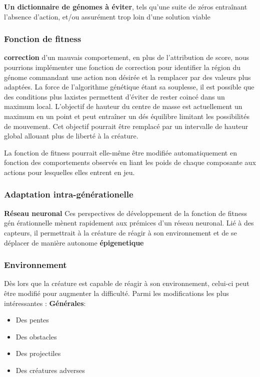 \documentclass[journal, a4paper]{IEEEtran}
\begin{document}
	\textbf{Un dictionnaire de génomes à éviter}, tels qu'une suite
	de zéros
	entraînant l'absence d'action, et/ou assurément trop loin d'une
	solution viable
\subsubsection{Fonction de fitness}
	\textbf{correction} d'un mauvais comportement, en plus de
	l'attribution	de score, nous
	pourrions implémenter une fonction de correction pour identifier
	la région du génome commandant une action non désirée et la
	remplacer par des valeurs plus adaptées.
	La force de l'algorithme génétique étant sa souplesse, il est possible
	que des conditions plus laxistes permettent d'éviter de rester coincé
	dans un maximum local.
	L'objectif de hauteur du centre de masse est
	actuellement un maximum en un point et peut entraîner un dés
	équilibre limitant les possibilités de mouvement.
	Cet objectif pourrait être remplacé par	un intervalle de hauteur
	global allouant plus de liberté à la créature.

	La fonction de fitness pourrait elle-même être modifiée
	automatiquement en fonction des comportements observés en liant
	les poids de chaque composante aux actions pour lesquelles elles
	entrent en jeu.
	\subsubsection{Adaptation intra-générationelle}
\textbf{Réseau neuronal}
	Ces perspectives de développement de la fonction de fitness gén
	érationnelle
	mènent rapidement aux prémices d'un réseau neuronal.
	Lié à des capteurs, il permettrait à la créature de réagir
	à son environnement et de se déplacer de manière autonome
	\textbf{épigenetique}


\subsubsection{Environnement}
	Dès lors que la créature est capable de réagir à son environnement,
	celui-ci peut être modifié pour augmenter la difficulté.
	Parmi les modifications les plus intéressantes :
	\textbf{Générales}:
	\begin{itemize}
			\item Des pentes
			\item Des obstacles
			\item Des projectiles
			\item Des créatures adverses
		\end{itemize}
\end{document}
